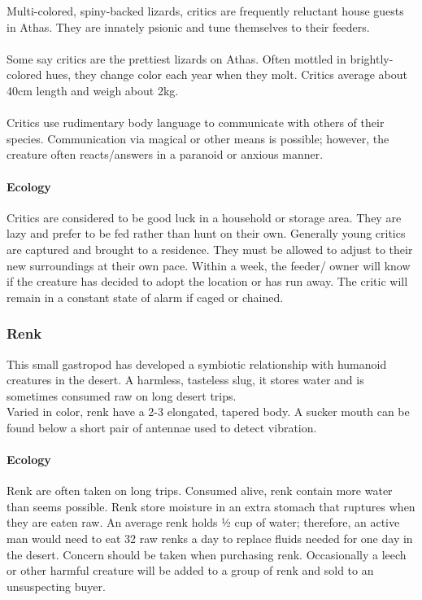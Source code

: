 Multi-colored, spiny-backed lizards, critics are frequently reluctant
house guests in Athas. They are innately psionic and tune
themselves to their feeders.\\
\\
Some say critics are the prettiest lizards on Athas. Often mottled
in brightly-colored hues, they change color each year when
they molt. Critics average about 40cm length and weigh about 2kg.\\
\\
Critics use rudimentary body language to communicate with
others of their species. Communication via magical or other
means is possible; however, the creature often reacts/answers in
a paranoid or anxious manner.

\paragraph{Ecology}
Critics are considered to be good luck in a household
or storage area. They are lazy and prefer to be fed rather than
hunt on their own. Generally young critics are captured and
brought to a residence. They must be allowed to adjust to their
new surroundings at their own pace. Within a week, the feeder/
owner will know if the creature has decided to adopt the
location or has run away. The critic will remain in a constant
state of alarm if caged or chained.

\subsubsection{Renk}

This small gastropod has developed a symbiotic relationship
with humanoid creatures in the desert. A harmless, tasteless
slug, it stores water and is sometimes consumed raw on long
desert trips.\\
Varied in color, renk have a 2-3 elongated, tapered body. A
sucker mouth can be found below a short pair of antennae used
to detect vibration.

\paragraph{Ecology}
Renk are often taken on long trips. Consumed alive,
renk contain more water than seems possible. Renk store moisture
in an extra stomach that ruptures when they are eaten raw.
An average renk holds 1⁄2 cup of water; therefore, an active
man would need to eat 32 raw renks a day to replace fluids needed
for one day in the desert. Concern should be taken when purchasing
renk. Occasionally a leech or other harmful creature
will be added to a group of renk and sold to an unsuspecting
buyer.

